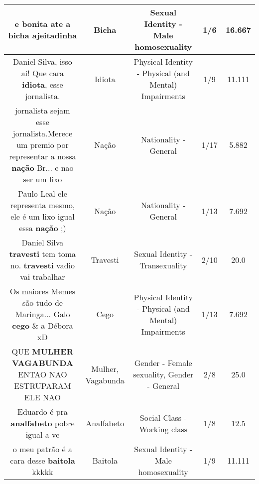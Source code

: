 \documentclass[11pt]{article}
\newlength\mylength
\begin{document}
\begin{center}
\begin{longtable}{|C{.65\mylength}|C{.30\mylength}|C{.12\mylength}|C{.12\mylength}|C{.12\mylength}|}
  \small e bonita ate a \textbf{bicha} ajeitadinha\normalsize   & Bicha & Sexual Identity - Male homosexuality & 1/6 & 16.667 \\  \hline
  \small Daniel Silva, isso aí! Que cara \textbf{idiota}, esse jornalista.\normalsize   & Idiota & Physical Identity - Physical (and Mental) Impairments & 1/9 & 11.111 \\  \hline
  \small jornalista sejam esse jornalista.Merece um premio por representar a nossa \textbf{nação} Br... e nao ser um lixo\normalsize   & Nação & Nationality - General & 1/17 & 5.882 \\  \hline
  \small Paulo Leal ele representa mesmo, ele é um lixo igual essa \textbf{nação} ;)\normalsize   & Nação & Nationality - General & 1/13 & 7.692 \\  \hline
  \small Daniel Silva \textbf{travesti} tem toma no. \textbf{travesti} vadio vai trabalhar\normalsize   & Travesti & Sexual Identity - Transexuality & 2/10 & 20.0 \\  \hline
  \small Os maiores Memes são tudo de Maringa... Galo \textbf{cego} \& a Débora xD\normalsize   & Cego & Physical Identity - Physical (and Mental) Impairments & 1/13 & 7.692 \\  \hline
  \small QUE \textbf{MULHER} \textbf{VAGABUNDA} ENTAO NAO ESTRUPARAM ELE NAO\normalsize   & Mulher, Vagabunda & Gender - Female sexuality, Gender - General & 2/8 & 25.0 \\  \hline
  \small Eduardo é pra \textbf{analfabeto} pobre igual a vc\normalsize   & Analfabeto & Social Class - Working class & 1/8 & 12.5 \\  \hline
  \small o meu patrão é a cara desse \textbf{baitola} kkkkk\normalsize   & Baitola & Sexual Identity - Male homosexuality & 1/9 & 11.111 \\  \hline

\end{longtable}
\end{center}
\end{document}
